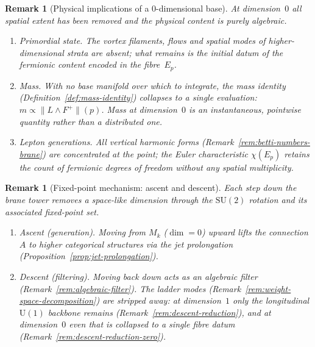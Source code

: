 \documentclass[12pt,a4paper]{report}
\newtheorem{remark}[theorem]{Remark}
\begin{document}
\begin{remark}[Physical implications of a $0$-dimensional base]
\label{rem:descent-physical-zero}
At dimension~$0$ all spatial extent has been removed and the physical
content is purely algebraic.
\begin{enumerate}
  \item \emph{Primordial state.}  The vortex filaments, flows and spatial
        modes of higher-dimensional strata are absent; what remains is
        the initial datum of the fermionic content encoded in the
        fibre~$E_p$.
  \item \emph{Mass.}  With no base manifold over which to integrate, the
        mass identity (Definition~\ref{def:mass-identity}) collapses to a
        single evaluation: $m \propto \lVert L \wedge F^+\rVert(p)$.
        Mass at dimension~$0$ is an instantaneous, pointwise quantity
        rather than a distributed one.
  \item \emph{Lepton generations.}  All vertical harmonic forms
        (Remark~\ref{rem:betti-numbers-brane}) are concentrated at the
        point; the Euler characteristic $\chi(E_p)$ retains the count of
        fermionic degrees of freedom without any spatial multiplicity.
\end{enumerate}
\end{remark}

\begin{remark}[Fixed-point mechanism: ascent and descent]
\label{rem:descent-fixed-point}
Each step down the brane tower removes a space-like dimension through the
$\mathrm{SU}(2)$ rotation and its associated fixed-point set.
\begin{enumerate}
  \item \emph{Ascent (generation).}  Moving from $M_k$ ($\dim = 0$) upward
        lifts the connection $A$ to higher categorical structures via the jet
        prolongation (Proposition~\ref{prop:jet-prolongation}).
  \item \emph{Descent (filtering).}  Moving back down acts as an algebraic
        filter (Remark~\ref{rem:algebraic-filter}).  The ladder modes
        (Remark~\ref{rem:weight-space-decomposition}) are stripped away:
        at dimension~$1$ only the longitudinal
        $\mathrm{U}(1)$ backbone remains
        (Remark~\ref{rem:descent-reduction}), and at dimension~$0$ even
        that is collapsed to a single fibre datum
        (Remark~\ref{rem:descent-reduction-zero}).
\end{enumerate}
\end{remark}
\end{document}
